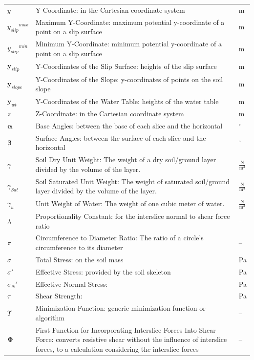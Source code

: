 \documentclass[12pt]{article}
\begin{document}
\begin{longtabu}{l X[l] l}
\\
$y$ & Y-Coordinate: in the Cartesian coordinate system & m
\\
${{y_{slip}}^{max}}$ & Maximum Y-Coordinate: maximum potential y-coordinate of a point on a slip surface & m
\\
${{y_{slip}}^{min}}$ & Minimum Y-Coordinate: minimum potential y-coordinate of a point on a slip surface & m
\\
${\mathbf{y}_{slip}}$ & Y-Coordinates of the Slip Surface: heights of the slip surface & m
\\
${\mathbf{y}_{slope}}$ & Y-Coordinates of the Slope: y-coordinates of points on the soil slope & m
\\
${\mathbf{y}_{wt}}$ & Y-Coordinates of the Water Table: heights of the water table & m
\\
$z$ & Z-Coordinate: in the Cartesian coordinate system & m
\\
$\mathbf{α}$ & Base Angles: between the base of each slice and the horizontal & ${}^{\circ}$
\\
$\mathbf{β}$ & Surface Angles: between the surface of each slice and the horizontal & ${}^{\circ}$
\\
$γ$ & Soil Dry Unit Weight: The weight of a dry soil/ground layer divided by the volume of the layer. & $\frac{\text{N}}{\text{m}^{3}}$
\\
${γ_{Sat}}$ & Soil Saturated Unit Weight: The weight of saturated soil/ground layer divided by the volume of the layer. & $\frac{\text{N}}{\text{m}^{3}}$
\\
${γ_{w}}$ & Unit Weight of Water: The weight of one cubic meter of water. & $\frac{\text{N}}{\text{m}^{3}}$
\\
$λ$ & Proportionality Constant: for the interslice normal to shear force ratio & --
\\
$π$ & Circumference to Diameter Ratio: The ratio of a circle's circumference to its diameter & --
\\
$σ$ & Total Stress: on the soil mass & Pa
\\
$σ'$ & Effective Stress: provided by the soil skeleton & Pa
\\
${σ_{N}}'$ & Effective Normal Stress:  & Pa
\\
$τ$ & Shear Strength:  & Pa
\\
$Υ$ & Minimization Function: generic minimization function or algorithm & --
\\
$\mathbf{Φ}$ & First Function for Incorporating Interslice Forces Into Shear Force: converts resistive shear without the influence of interslice forces, to a calculation considering the interslice forces & --

\end{longtabu}
\end{document}
